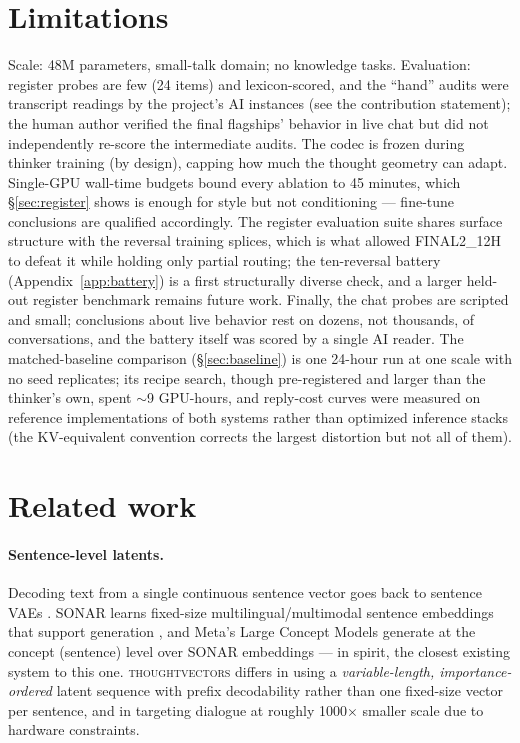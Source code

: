 \documentclass[11pt]{article}
\newcommand{\thoughtvec}{\textsc{thoughtvectors}}
\begin{document}
\section{Limitations}
\label{sec:limitations}

Scale: 48M parameters, small-talk domain; no knowledge tasks. Evaluation:
register probes are few (24 items) and lexicon-scored, and the ``hand''
audits were transcript readings by the project's AI instances (see the
contribution statement); the human author verified the final flagships'
behavior in live chat but did not independently re-score the intermediate
audits. The codec is frozen during thinker training (by design), capping
how much the thought geometry can adapt. Single-GPU wall-time budgets bound
every ablation to 45 minutes, which \S\ref{sec:register} shows is enough for
style but not conditioning --- fine-tune conclusions are qualified
accordingly. The register evaluation suite shares surface structure with the
reversal training splices, which is what allowed FINAL2\_12H to defeat it
while holding only partial routing; the ten-reversal battery
(Appendix~\ref{app:battery}) is a first structurally diverse check, and a
larger held-out register benchmark remains future work. Finally, the chat
probes are scripted and small; conclusions about live behavior rest on
dozens, not thousands, of conversations, and the battery itself was scored
by a single AI reader. The matched-baseline comparison
(\S\ref{sec:baseline}) is one 24-hour run at one scale with no seed
replicates; its recipe search, though pre-registered and larger than the
thinker's own, spent $\sim$9 GPU-hours, and reply-cost curves were measured
on reference implementations of both systems rather than optimized
inference stacks (the KV-equivalent convention corrects the largest
distortion but not all of them).

\section{Related work}
\label{sec:related}

\paragraph{Sentence-level latents.} Decoding text from a single continuous
sentence vector goes back to sentence VAEs \citep{bowman2016sentences}.
SONAR learns fixed-size multilingual/multimodal sentence embeddings that
support generation \citep{duquenne2023sonar}, and Meta's Large Concept
Models generate at the concept (sentence) level over SONAR embeddings
\citep{lcm2024} --- in spirit, the closest existing system to this one.
\thoughtvec{} differs in using a \emph{variable-length, importance-ordered}
latent sequence with prefix decodability rather than one fixed-size vector
per sentence, and in targeting dialogue at roughly 1000$\times$ smaller
scale due to hardware constraints.
\end{document}
